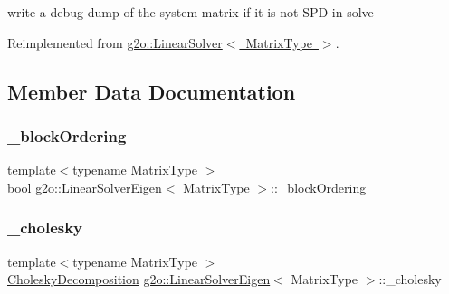 write a debug dump of the system matrix if it is not S\+PD in solve 



Reimplemented from \mbox{\hyperlink{classg2o_1_1_linear_solver_ac4b23c56cf69759a692906fc8816cf8f}{g2o\+::\+Linear\+Solver$<$ Matrix\+Type $>$}}.



\subsection{Member Data Documentation}
\mbox{\label{classg2o_1_1_linear_solver_eigen_a041970f37a5a6e63778f0c40e7c6e948}} 
\subsubsection{\texorpdfstring{\+\_\+block\+Ordering}{\_blockOrdering}}
{\footnotesize\ttfamily template$<$typename Matrix\+Type $>$ \\
bool \mbox{\hyperlink{classg2o_1_1_linear_solver_eigen}{g2o\+::\+Linear\+Solver\+Eigen}}$<$ Matrix\+Type $>$\+::\+\_\+block\+Ordering\hspace{0.3cm}{\ttfamily [protected]}}

\mbox{\label{classg2o_1_1_linear_solver_eigen_ab7205de4c6820b3ecd7ed7f39bbdf573}} 
\subsubsection{\texorpdfstring{\+\_\+cholesky}{\_cholesky}}
{\footnotesize\ttfamily template$<$typename Matrix\+Type $>$ \\
\mbox{\hyperlink{classg2o_1_1_linear_solver_eigen_1_1_cholesky_decomposition}{Cholesky\+Decomposition}} \mbox{\hyperlink{classg2o_1_1_linear_solver_eigen}{g2o\+::\+Linear\+Solver\+Eigen}}$<$ Matrix\+Type $>$\+::\+\_\+cholesky\hspace{0.3cm}{\ttfamily [protected]}}

